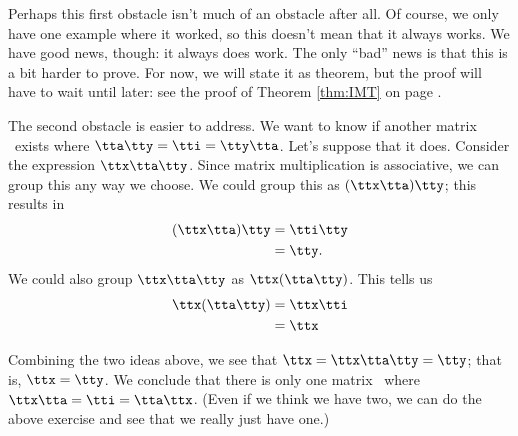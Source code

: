 Perhaps this first obstacle isn't much of an obstacle after all. Of course, we only have one example where it worked, so this doesn't mean that it always works. We have good news, though: it always does work. The only ``bad'' news is that this is a bit harder to prove. For now, we will state it as theorem, but the proof will have to wait until later: see the proof of Theorem \ref{thm:IMT} on page \pageref{ax_xa_proof}.

\smallskip


\smallskip


The second obstacle is easier to address. We want to know if another matrix \tty\ exists where $\tta\tty = \tti =\tty\tta$. Let's suppose that it does. Consider the expression $\ttx\tta\tty$. Since matrix multiplication is associative, we can group this any way we choose. We could group this as $(\ttx\tta)\tty$; this results in 
\begin{align*}
(\ttx\tta)\tty	&= \tti\tty\\
								&= \tty.
\end{align*}
We could also group $\ttx\tta\tty$ as $\ttx(\tta\tty)$. This tells us 
\begin{align*}
\ttx(\tta\tty) &= \ttx\tti\\
		&= \ttx
\end{align*}

Combining the two ideas above, we see that $\ttx = \ttx\tta\tty = \tty$; that is, $\ttx=\tty$. We conclude that there is only one matrix \ttx\ where $\ttx\tta = \tti = \tta\ttx$. (Even if we think we have two, we can do the above exercise and see that we really just have one.)

